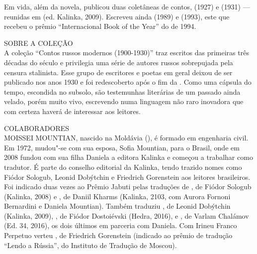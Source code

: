 Em vida, além da novela, publicou duas coletâneas de contos,
{} (1927) e {} (1931) — reunidas em
{} (ed. Kalinka, 2009). Escreveu ainda
{} (1989) e {} (1993), este que
recebeu o prêmio “Internacional Book of the Year” do {} de 1994.

\bigskip

\noindent{}SOBRE A COLEÇÃO\\

A coleção “Contos russos modernos (1900-1930)” traz escritos das
primeiras três décadas do século  e privilegia uma série de autores
russos sobrepujada pela censura stalinista. Esse grupo de escritores e
poetas em geral deixou de ser publicado nos anos 1930 e foi redescoberto
após o fim da . Como uma cápsula do tempo, escondida no subsolo, são
testemunhas literárias de um passado ainda velado, porém muito vivo,
escrevendo numa linguagem não raro inovadora que com certeza haverá de
interessar aos leitores.

\pagebreak

\noindent{}COLABORADORES\\

\noindent{}MOISSEI MOUNTIAN, nascido na Moldávia (), é formado em engenharia civil. Em 1972, mudou"-se com sua esposa, Sofia Mountian, para o Brasil,
onde em 2008 fundou com sua filha Daniela a editora Kalinka e começou a
trabalhar como tradutor. É parte do conselho editorial da Kalinka, tendo
trazido nomes como Fiódor Sologub, Leonid Dobýtchin e Friedrich
Gorenstein aos leitores brasileiros. Foi indicado duas vezes ao Prêmio
Jabuti pelas traduções de {}, de Fiódor Sologub
(Kalinka, 2008) e {}, de Daniil Kharms (Kalinka, 2103, com Aurora Fornoni
Bernardini e Daniela Mountian). Também traduziu {}, de Leonid Dobýtchin (Kalinka, 2009), {}, de Fiódor Dostoiévski
(Hedra, 2016), e {}, de
Varlam Chalámov (Ed. 34, 2016), os dois últimos em parceria com Daniela.
Com Irineu Franco Perpetuo verteu {}, de Friedrich Gorenstein
(indicado ao prêmio de tradução “Lendo a Rússia”, do Instituto de
Tradução de Moscou).

%


